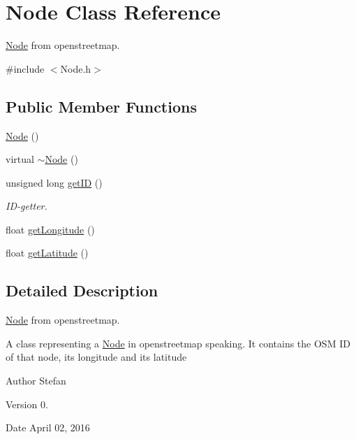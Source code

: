 \hypertarget{classNode}{\section{Node Class Reference}
\label{classNode}
}


\hyperlink{classNode}{Node} from openstreetmap.  




{\ttfamily \#include $<$Node.\+h$>$}

\subsection*{Public Member Functions}
\begin{DoxyCompactItemize}
\item 
\hyperlink{classNode_ad7a34779cad45d997bfd6d3d8043c75f}{Node} ()
\item 
virtual \hyperlink{classNode_aa0840c3cb5c7159be6d992adecd2097c}{$\sim$\+Node} ()
\item 
unsigned long \hyperlink{classNode_a0557c98e510afe0964734b397f2fcd2a}{get\+I\+D} ()
\begin{DoxyCompactList}\small\item\em I\+D-\/getter. \end{DoxyCompactList}\item 
float \hyperlink{classNode_ad6be1e5333414b24f7c3ce59a64b5112}{get\+Longitude} ()
\item 
float \hyperlink{classNode_aa6baaf1097d6196c4cac5f3337adfc7f}{get\+Latitude} ()
\end{DoxyCompactItemize}


\subsection{Detailed Description}
\hyperlink{classNode}{Node} from openstreetmap. 

A class representing a \hyperlink{classNode}{Node} in openstreetmap speaking. It contains the O\+S\+M I\+D of that node, its longitude and its latitude

\begin{DoxyAuthor}{Author}
Stefan 
\end{DoxyAuthor}
\begin{DoxyVersion}{Version}
0. 
\end{DoxyVersion}
\begin{DoxyDate}{Date}
April 02, 2016 
\end{DoxyDate}


